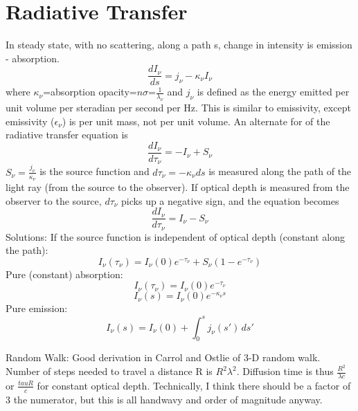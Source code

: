 \section{Radiative Transfer}
In steady state, with no scattering, along a path s, change in intensity is emission - absorption.
\begin{displaymath}\frac{dI_{\nu}}{ds}=j_{\nu}-\kappa_{\nu}I_{\nu}\end{displaymath}
where $\kappa_{\nu}$=absorption opacity=$n\sigma$=$\frac{1}{\lambda_{\nu}}$ and $j_{\nu}$ is 
defined as the energy emitted per unit volume per steradian per second per Hz.  This is similar 
to emissivity, except emissivity ($\epsilon_{\nu}$) is per unit mass, not per unit volume.
An alternate for of the radiative transfer equation is 
\begin{displaymath}\frac{dI_{\nu}}{d\tau_{\nu}}=-I_{\nu}+S_{\nu}\end{displaymath}
$S_{\nu}=\frac{j_{\nu}}{\kappa_{\nu}}$ is the source function and $d\tau_{\nu}=-\kappa_{\nu}ds$ 
is measured along the path of the light ray (from the source to the observer).  If optical depth 
is measured from the observer to the source, $d\tau_{\nu}$ picks up a negative sign, and the 
equation becomes
\begin{displaymath}\frac{dI_{\nu}}{d\tau_{\nu}}=I_{\nu}-S_{\nu}\end{displaymath}
Solutions:\newline
If the source function is independent of optical depth (constant along the path):\newline
\begin{displaymath}I_{\nu}(\tau_{\nu})=I_{\nu}(0)e^{-\tau_{\nu}}+S_{\nu}(1-e^{-\tau_{\nu}})\end{displaymath}
Pure (constant) absorption:\newline
\begin{displaymath}I_{\nu}(\tau_{\nu})=I_{\nu}(0)e^{-\tau_{\nu}}\end{displaymath}
\begin{displaymath}I_{\nu}(s)=I_{\nu}(0)e^{-\kappa_{\nu} s}\end{displaymath}
Pure emission:\newline
\begin{displaymath}I_{\nu}(s)=I_{\nu}(0)+\int_0^s j_{\nu}(s')\,ds'\end{displaymath}

Random Walk:\newline
Good derivation in Carrol and Ostlie of 3-D random walk.  Number of steps needed to travel a 
distance R is $R^2\lambda^2$.  Diffusion time is thus $\frac{R^2}{\lambda c}$ or $\frac{tau R}{c}$ 
for constant optical depth.  Technically, I think there should be a factor of 3 the numerator, 
but this is all handwavy and order of magnitude anyway.


